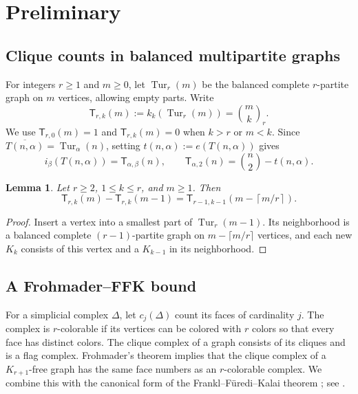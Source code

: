\documentclass[11pt]{article}
\newtheorem{lemma}[lemma]{Lemma}
\theoremstyle{definition}
\newcommand{\Turan}{\operatorname{Tur}}
\newcommand{\ceil}[1]{\left\lceil #1\right\rceil}
\newcommand{\turcl}[3]{\mathsf{T}_{#1,#2}(#3)}
\begin{document}
\section{Preliminary}
\label{sec:tools}

\subsection{Clique counts in balanced multipartite graphs}

For integers $r\ge1$ and $m\ge0$, let $\Turan_r(m)$ be the balanced
complete $r$-partite graph on $m$ vertices, allowing empty parts.
Write
\[
 \turcl{r}{k}{m}:=k_k(\Turan_r(m))=\binom mk_r.
\]
We use $\turcl{r}{0}{m}=1$ and $\turcl{r}{k}{m}=0$ when $k>r$ or
$m<k$. Since $\overline{T(n,\alpha)}=\Turan_\alpha(n)$, setting
$t(n,\alpha):=e(T(n,\alpha))$ gives
\begin{equation}\label{eq:T-independent}
 i_\beta(T(n,\alpha))=\turcl{\alpha}{\beta}{n},
 \qquad
 \turcl{\alpha}{2}{n}=\binom n2-t(n,\alpha).
\end{equation}

\begin{lemma}\label{lem:turan-recurrence}
Let $r\ge2$, $1\le k\le r$, and $m\ge1$. Then
\begin{equation}\label{eq:general-recurrence}
 \turcl{r}{k}{m}-\turcl{r}{k}{m-1}
 =\turcl{r-1}{k-1}{m-\ceil{m/r}}.
\end{equation}
\end{lemma}

\begin{proof}
Insert a vertex into a smallest part of $\Turan_r(m-1)$. Its
neighborhood is a balanced complete $(r-1)$-partite graph on
$m-\lceil m/r\rceil$ vertices, and each new $K_k$ consists of this
vertex and a $K_{k-1}$ in its neighborhood.
\end{proof}


\subsection{A Frohmader--FFK bound}

For a simplicial complex $\Delta$, let $c_j(\Delta)$ count its faces
of cardinality $j$. The complex is $r$-colorable if its vertices can
be colored with $r$ colors so that every face has distinct colors.
The clique complex of a graph consists of its cliques and is a flag
complex. Frohmader's theorem \cite[Theorem~1.1]{Frohmader2008}
implies that the clique complex of a $K_{r+1}$-free graph has the same
face numbers as an $r$-colorable complex. We combine this with the
canonical form of the Frankl--F\"uredi--Kalai theorem
\cite{FranklFurediKalai1988}; see
\cite[Lemma~3.6 and Theorem~3.7]{Frohmader2008}.
\end{document}
